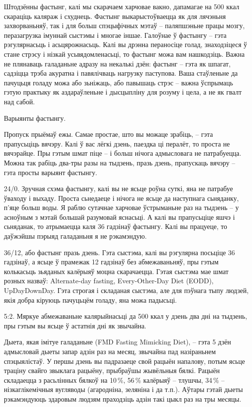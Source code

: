 Штодзённы фастынг, калі мы скарачаем харчовае вакно, дапамагае на 500 ккал скараціць каляраж і схуднець. Фастынг выкарыстоўваецца як для лячэньня захворваньняў, так і для больш спэцыфічных мэтаў – паляпшэньне працы мозгу, перазагрузка імуннай сыстэмы і многае іншае. Галоўнае ў фастынгу – гэта рэгулярнасьць і асьцярожнасьць. Калі вы дрэнна пераносіце голад, знаходзіцеся ў стане стрэсу і нізкай усьвядомленасьці, то фастынг можа вам нашкодзіць. Важна не плянаваць галаданьне адразу на некалькі дзён: фастынг – гэта як шпагат, садзіцца трэба акуратна і павялічваць нагрузку паступова. Ваша стаўленьне да пачуцьця голаду можа або зьніжаць, або павышаць стрэс – важна ўспрымаць гэтую практыку як аздараўленьне і дысцыпліну для розуму і цела, а не як гвалт над сабой.

Варыянты фастынгу.

Пропуск прыёмаў ежы. Самае простае, што вы можаце зрабіць, – гэта прапусьціць вячэру. Калі ў вас лёгкі дзень, паездка ці пералёт, то проста не вячэрайце. Пры гэтым шмат піце – і больш нічога адмысловага не патрабуецца. Можна так рабіць два-тры разы на тыдзень, празь дзень, прапускаць вячэру – гэта просты варыянт фастынгу.

24/0. Зручная схэма фастынгу, калі вы не ясьце роўна суткі, яна не патрабуе ўваходу і выхаду. Проста сьнедаеце і нічога не ясьце да наступнага сьняданку, п'яце больш воды. Я раблю сутачнае харчовае ўстрыманьне раз на тыдзень – у асноўным з мэтай большай разумовай яснасьці. А калі вы прапусьціце яшчэ і сьняданак, то атрымаецца каля 36 гадзінаў фастынгу. Калі вы працуеце, то даўжэйшы пэрыяд галаданьня я не рэкамэндую.

36/12, або фастынг празь дзень. Гэта сыстэма, калі вы рэгулярна посьціце 36 гадзінаў, а ясьце ў прамежак 12 гадзінаў без абмежаваньняў, пры гэтым колькасьць зьяданых калёрыяў моцна скарачаецца. Гэтая сыстэма мае шмат розных назваў: Alternate-day fasting, Every-Other-Day Diet (EODD), UpDayDownDay. Гэта строгая і складаная сыстэма, але для пэўнага тыпу людзей, якія добра кіруюць пачуцьцём голаду, яна можа падысьці.

5:2. Мяркуе абмежаваньне калярыйнасьці да 500 ккал у дзень два дні на тыдзень, пры гэтым вы ясьце ў астатнія дні як звычайна.

Дыета, якая імітуе галаданьне (FMD Fasting Mimicking Diet), – гэта 5 дзён адмысловай дыеты запар адзін раз на месяц, звычайна пад назіраньнем спэцыялістаў. У першы дзень вы падразаеце свой рацыён напалову, потым ясьце траціну свайго звыклага рацыёну, прыбраўшы жывёльныя бялкі. Рацыён складаецца з расьлінных бялкоў на 10\,\%, 56\,\% калёрыяў – тлушчы, 34\,\% – нізкаглікемічныя вугляводы (агародніна, зеляніна і да т.п.). Аўтары гэтай дыеты рэкамэндуюць здаровым людзям праходзіць адзін такі цыкл раз на тры месяцы.

